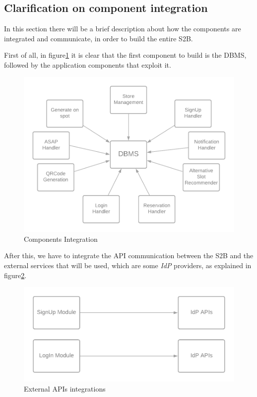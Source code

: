 \documentclass[table, 12pt]{article}
\begin{document}
\subsection{Clarification on component integration}
In this section there will be a brief description about how the components are integrated and communicate, in order to build the entire S2B.

First of all, in figure\ref{components_integration} it is clear that the first component to build is the DBMS, followed by the application components that exploit it.

\begin{center}
    \begin{figure}[H]
        \includegraphics[width=\textwidth]{assets/IT-Plan/Components-Integration.png}
        \caption{Components Integration}\label{components_integration}
    \end{figure}
\end{center}

After this, we have to integrate the API communication between the S2B and the external services that will be used, which are some \textit{IdP} providers, as explained in figure\ref{external_services}.

\begin{center}
    \begin{figure}[H]
        \includegraphics[width=\textwidth]{assets/IT-Plan/External-Services.png}
        \caption{External APIs integrations}\label{external_services}
    \end{figure}
\end{center}
\end{document}
